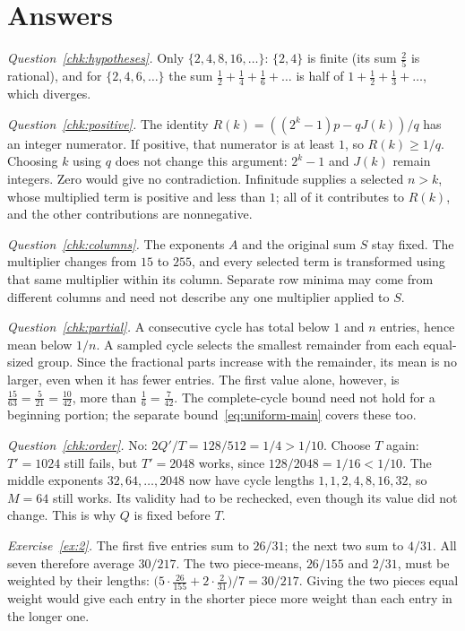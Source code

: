 \documentclass[10pt]{article}
\theoremstyle{plain}
\theoremstyle{definition}
\theoremstyle{remark}
\begin{document}
\section{Answers}\label{app:answers}
\begingroup
\setlength{\parskip}{0.7ex plus 0.2ex}
\setlength{\parindent}{0pt}

\emph{Question~\ref{chk:hypotheses}.} Only $\{2,4,8,16,\dots\}$: $\{2,4\}$ is
finite (its sum $\tfrac25$ is rational), and for $\{2,4,6,\dots\}$ the sum
$\tfrac12+\tfrac14+\tfrac16+\dots$ is half of $1+\tfrac12+\tfrac13+\dots$,
which diverges.

\emph{Question~\ref{chk:positive}.} The identity
$R(k)=((2^k-1)p-qJ(k))/q$ has an integer numerator. If positive, that
numerator is at least $1$, so $R(k)\ge1/q$. Choosing $k$ using $q$ does not
change this argument: $2^k-1$ and $J(k)$ remain integers. Zero would give no
contradiction. Infinitude supplies a selected $n>k$, whose multiplied term
is positive and less than $1$; all of it contributes to $R(k)$, and the
other contributions are nonnegative.

\emph{Question~\ref{chk:columns}.} The exponents $A$ and the original sum
$S$ stay fixed. The multiplier changes from $15$ to $255$, and every
selected term is transformed using that same multiplier within its column.
Separate row minima may come from different columns and need not describe
any one multiplier applied to $S$.

\emph{Question~\ref{chk:partial}.} A consecutive cycle has total below $1$
and $n$ entries, hence mean below $1/n$. A sampled cycle selects the smallest
remainder from each equal-sized group. Since the fractional parts increase
with the remainder, its mean is no larger, even when it has fewer entries.
The first value
alone, however, is $\tfrac{15}{63}=\tfrac5{21}=\tfrac{10}{42}$, more than
$\tfrac16=\tfrac7{42}$. The complete-cycle bound need not hold for a
beginning portion; the separate bound~\eqref{eq:uniform-main} covers these too.

\emph{Question~\ref{chk:order}.} No:
$2Q'/T=128/512=1/4>1/10$. Choose $T$ again: $T'=1024$ still fails,
but $T'=2048$ works, since $128/2048=1/16<1/10$.
The middle exponents $32,64,\dots,2048$ now have cycle lengths
$1,1,2,4,8,16,32$, so $M=64$ still works. Its validity had to be
rechecked, even though its value did not change. This is why $Q$ is fixed
before $T$.

\emph{Exercise~\ref{ex:2}.} The first five entries sum to $26/31$;
the next two sum to $4/31$. All seven therefore average $30/217$.
The two piece-means, $26/155$ and $2/31$, must be weighted by their lengths:
$\bigl(5\cdot\tfrac{26}{155}+2\cdot\tfrac2{31}\bigr)/7=30/217$.
Giving the two pieces equal weight would give each entry in the shorter
piece more weight than each entry in the longer one.
\end{document}
